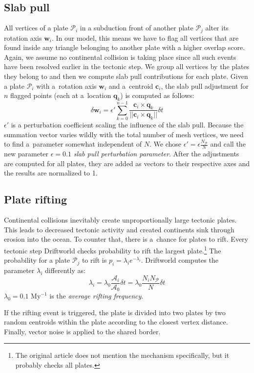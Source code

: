 \subsection{Slab pull}
All vertices of a plate $\mathcal{P}_i$ in a subduction front of another plate $\mathcal{P}_j$ alter its rotation axis $\mathbf{w}_i$. In our model, this means we have to flag all vertices that are found inside any triangle belonging to another plate with a higher overlap score. Again, we assume no continental collision is taking place since all such events have been resolved earlier in the tectonic step. We group all vertices by the plates they belong to and then we compute slab pull contributions for each plate. Given a plate $\mathcal{P}_i$ with a~rotation axis $\mathbf{w}_i$ and a~centroid $\mathbf{c}_i$, the slab pull adjustment for $n$ flagged points (each at a~location $\mathbf{q}_k$) is computed as follows:
$$\delta\mathbf{w}_i=\epsilon'\sum_{k=0}^{n-1}\frac{\mathbf{c}_i\times\mathbf{q}_k}{||\mathbf{c}_i\times\mathbf{q}_k||}\delta t$$
$\epsilon'$ is a perturbation coefficient scaling the influence of the slab pull. Because the summation vector varies wildly with the total number of mesh vertices, we need to find a~parameter somewhat independent of $N$. We chose $\epsilon'=\epsilon\frac{N_\mathcal{P}}{N}$ and call the new parameter $\epsilon=0.1$ \textit{slab pull perturbation parameter}. After the adjustments are computed for all plates, they are added as vectors to their respective axes and the results are normalized to 1.
\subsection{Plate rifting}
Continental collisions inevitably create unproportionally large tectonic plates. This leads to decreased tectonic activity and created continents sink through erosion into the ocean. To counter that, there is a~chance for plates to rift. Every tectonic step Driftworld checks probability to rift the largest plate.\footnote{The original article does not mention the mechanism specifically, but it probably checks all plates.} The probability for a plate $\mathcal{P}_j$ to rift is $p_i=\lambda_i e^{-\lambda_i}$. Driftworld computes the parameter $\lambda_i$ differently as:
$$\lambda_i=\lambda_0\frac{\mathcal{A}_i}{\mathcal{A}_0}\delta t=\lambda_0\frac{N_iN_\mathcal{P}}{N}\delta t$$
$\lambda_0=0.1\mbox{ My}^{-1}$ is the \textit{average rifting frequency}.

If the rifting event is triggered, the plate is divided into two plates by two random centroids within the plate according to the closest vertex distance. Finally, vector noise is applied to the shared border.
